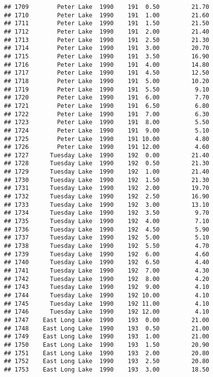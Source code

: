 \documentclass[
]{article}
\begin{document}
\begin{verbatim}
## 1709        Peter Lake  1990    191  0.50         21.70
## 1710        Peter Lake  1990    191  1.00         21.60
## 1711        Peter Lake  1990    191  1.50         21.50
## 1712        Peter Lake  1990    191  2.00         21.40
## 1713        Peter Lake  1990    191  2.50         21.30
## 1714        Peter Lake  1990    191  3.00         20.70
## 1715        Peter Lake  1990    191  3.50         16.90
## 1716        Peter Lake  1990    191  4.00         14.80
## 1717        Peter Lake  1990    191  4.50         12.50
## 1718        Peter Lake  1990    191  5.00         10.20
## 1719        Peter Lake  1990    191  5.50          9.10
## 1720        Peter Lake  1990    191  6.00          7.70
## 1721        Peter Lake  1990    191  6.50          6.80
## 1722        Peter Lake  1990    191  7.00          6.30
## 1723        Peter Lake  1990    191  8.00          5.50
## 1724        Peter Lake  1990    191  9.00          5.10
## 1725        Peter Lake  1990    191 10.00          4.80
## 1726        Peter Lake  1990    191 12.00          4.60
## 1727      Tuesday Lake  1990    192  0.00         21.40
## 1728      Tuesday Lake  1990    192  0.50         21.30
## 1729      Tuesday Lake  1990    192  1.00         21.40
## 1730      Tuesday Lake  1990    192  1.50         21.30
## 1731      Tuesday Lake  1990    192  2.00         19.70
## 1732      Tuesday Lake  1990    192  2.50         16.90
## 1733      Tuesday Lake  1990    192  3.00         13.10
## 1734      Tuesday Lake  1990    192  3.50          9.70
## 1735      Tuesday Lake  1990    192  4.00          7.10
## 1736      Tuesday Lake  1990    192  4.50          5.90
## 1737      Tuesday Lake  1990    192  5.00          5.10
## 1738      Tuesday Lake  1990    192  5.50          4.70
## 1739      Tuesday Lake  1990    192  6.00          4.60
## 1740      Tuesday Lake  1990    192  6.50          4.40
## 1741      Tuesday Lake  1990    192  7.00          4.30
## 1742      Tuesday Lake  1990    192  8.00          4.20
## 1743      Tuesday Lake  1990    192  9.00          4.10
## 1744      Tuesday Lake  1990    192 10.00          4.10
## 1745      Tuesday Lake  1990    192 11.00          4.10
## 1746      Tuesday Lake  1990    192 12.00          4.10
## 1747    East Long Lake  1990    193  0.00         21.00
## 1748    East Long Lake  1990    193  0.50         21.00
## 1749    East Long Lake  1990    193  1.00         21.00
## 1750    East Long Lake  1990    193  1.50         20.90
## 1751    East Long Lake  1990    193  2.00         20.80
## 1752    East Long Lake  1990    193  2.50         20.80
## 1753    East Long Lake  1990    193  3.00         18.50

\end{verbatim}
\end{document}
